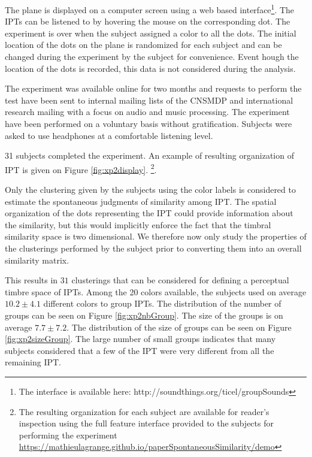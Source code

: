 \documentclass{bmcart}
\newcommand{\ipt}{IPT\xspace}
\newcommand{\ipts}{IPTs\xspace}
\begin{document}
\begin{backmatter}
The plane is displayed on a computer screen using a web based interface\footnote{The interface is available here: http://soundthings.org/ticel/groupSounds}. The \ipts can be listened to by hovering the mouse on the corresponding dot. The experiment is over when the subject assigned a color to all the dots. The initial location of the dots on the plane is randomized for each subject and can be changed during the experiment by the subject for convenience. Event hough the location of the dots is recorded, this data is not considered during the analysis.

The experiment was available online for two months and requests to perform the test have been sent to internal mailing lists of the CNSMDP and international research mailing with a focus on audio and music processing. The experiment have been performed on a voluntary basis without gratification. Subjects were asked to use headphones at a comfortable listening level.


31 subjects completed the experiment. An example of resulting organization of \ipt is given on Figure \ref{fig:xp2display}. \footnote{The resulting organization for each subject are available for reader's inspection using the full feature interface provided to the subjects for performing the experiment \url{https://mathieulagrange.github.io/paperSpontaneousSimilarity/demo}}.

Only the clustering given by the subjects using the color labels is considered to estimate the spontaneous judgments of similarity among \ipt. The spatial organization of the dots representing the \ipt could provide information about the similarity, but this would implicitly enforce the fact that the timbral similarity space is two dimensional. We therefore now only study the properties of the clusterings performed by the subject prior to converting them into an overall similarity matrix.

This results in $31$ clusterings that can be considered for defining a perceptual timbre space of \ipts. Among the 20 colors available, the subjects used on average $10.2 \pm  4.1$ different colors to group \ipts. The distribution of the number of groups can be seen on Figure \ref{fig:xp2nbGroup}. The size of the groups is on average $7.7 \pm   7.2$. The distribution of the size of groups can be seen on Figure \ref{fig:xp2sizeGroup}. The large number of small groups indicates that many subjects considered that a few of the \ipt were very different from all the remaining \ipt.


\end{backmatter}
\end{document}

